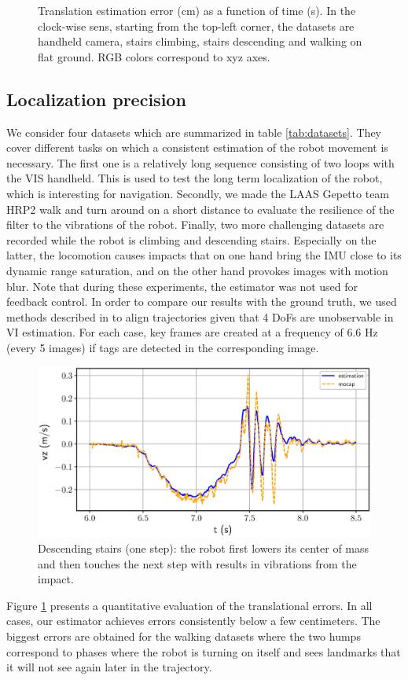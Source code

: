 \begin{figure}
    \caption{Translation estimation error (cm) as a function of time (s). In the clock-wise sens, starting from the top-left corner, the datasets are handheld camera, stairs climbing, stairs descending and walking on flat ground. RGB colors correspond to xyz axes.}
    \label{fig:results}
\end{figure}
%
%
\subsection{Localization precision}
%
We consider four datasets which are summarized in table \ref{tab:datasets}. They cover different tasks on which a consistent estimation of the robot movement is necessary. The first one is a relatively long sequence consisting of two loops with the VIS handheld. This is used to test the long term localization of the robot, which is interesting for navigation. Secondly, we made the LAAS Gepetto team HRP2 walk and turn around on a short distance to evaluate the resilience of the filter to the vibrations of the robot. Finally, two more challenging datasets are recorded while the robot is climbing and descending stairs. Especially on the latter, the locomotion causes impacts that on one hand bring the IMU close to its dynamic range saturation, and on the other hand provokes images with motion blur. Note that during these experiments, the estimator was not used for feedback control. In order to compare our results with the ground truth, we used methods described in \cite{zhangtutorial} to align trajectories given that 4 DoFs are unobservable in VI estimation.
For each case, key frames are created at a frequency of 6.6 Hz (every 5 images) if tags are detected in the corresponding image.
%
\begin{figure}[!t]
    \centering
    \includegraphics[scale=0.35]{figures/absolute/vz_descending_onestep.eps}
    \caption{Descending stairs (one step): the robot first lowers its center of mass and then touches the next step with results in vibrations from the impact.}
    \label{fig:vz_descending_onestep}
\end{figure}
%
Figure \ref{fig:results} presents a quantitative evaluation of the translational errors. In all cases, our estimator achieves errors consistently below a few centimeters. The biggest errors are obtained for the walking datasets where the two humps correspond to phases where the robot is turning on itself and sees landmarks that it will not see again later in the trajectory.


